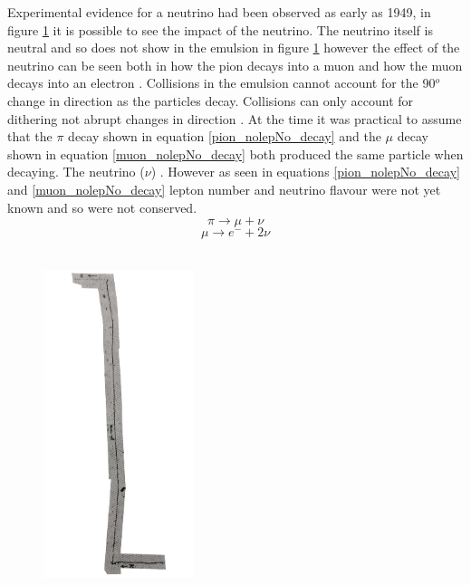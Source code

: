Experimental evidence for a neutrino had been observed as early as 1949, in figure \ref{pion_path} it is possible to see the impact of the neutrino. The neutrino itself is neutral and so does not show in the emulsion in figure \ref{pion_path} however the effect of the neutrino can be seen both in how the pion decays into a muon and how the muon decays into an electron \cite{griffiths2008book} \cite{griffiths2008neutrino1.5}. Collisions in the emulsion cannot account for the 90$^o$ change in direction as the particles decay. Collisions can only account for dithering not abrupt changes in direction \cite{griffiths2008book} \cite{griffiths2008neutrino1.5}. At the time it was practical to assume that the $\pi$ decay shown in equation \ref{pion_nolepNo_decay} and the $\mu$ decay shown in equation \ref{muon_nolepNo_decay} both produced the same particle when decaying. The neutrino ($\nu$) \cite{griffiths2008book} \cite{griffiths2008neutrino1.5}. However as seen in equations \ref{pion_nolepNo_decay} and \ref{muon_nolepNo_decay} lepton number and neutrino flavour were not yet known and so were not conserved.
\begin{equation}
    \pi \rightarrow \mu + \nu
    \label{pion_nolepNo_decay}
\end{equation}
\begin{equation}
    \mu \rightarrow e^- + 2\nu
    \label{muon_nolepNo_decay}
\end{equation}
\\
\begin{figure}[htbp]
 \centering
 \includegraphics[height=90mm]{Chapter1/Figs/Raster/less_detailed_proper_path.png}
 \label{pion_path}
\end{figure}
